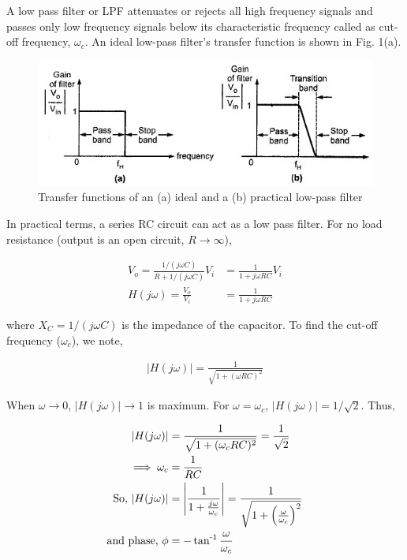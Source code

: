 A low pass filter or LPF attenuates or rejects all high frequency signals and passes only low frequency signals below its characteristic frequency called as cut-off frequency, $\omega_c$. An ideal low-pass filter's transfer function is shown in Fig. 1(a).

\begin{figure}[H]
    \centering
    \includegraphics[width=1\columnwidth]{images/f5.jpg}
    \caption{Transfer functions of an (a) ideal and a (b) practical low-pass filter}
    \label{fig:1}
\end{figure}

In practical terms, a series RC circuit can act as a low pass filter. For no load resistance (output is an open circuit, $R \rightarrow \infty$),

\begin{align}
    V_o = \frac{1/(j\omega C)}{R+1/(j\omega C)}V_i &= \frac{1}{1+j\omega RC}V_i\\
    H(j\omega) = \frac{V_o}{V_i} &= \frac{1}{1+j\omega RC}
\end{align}

where $X_C = 1/(j\omega C)$ is the impedance of the capacitor. To find the cut-off frequency ($\omega_c$), we note,

\begin{align}
    |H(j\omega)| = \frac{1}{\sqrt{1+(\omega RC)^2}}
\end{align}

When $\omega \rightarrow 0$, $|H(j\omega)| \rightarrow 1$ is maximum. For $\omega = \omega_c$, $|H(j\omega)| = 1/\sqrt{2}$. Thus,

\begin{align}
    |H(j\omega)| &= \frac{1}{\sqrt{1+(\omega_c RC)^2}} = \frac{1}{\sqrt{2}}\\
    \implies \omega_c &= \frac{1}{RC}\\
    \text{So, } |H(j\omega)| &= \Bigg|\frac{1}{1+\frac{j\omega}{\omega_c}}\Bigg| = \frac{1}{\sqrt{1+\left(\frac{\omega}{\omega_c}\right)^2}} \\
    \text{and phase, } \phi &= -\operatorname{tan^{-1}}{\frac{\omega}{\omega_c}}
\end{align}

